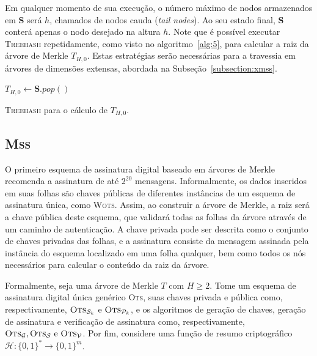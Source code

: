 \documentclass[12pt,notitlepage]{report}
\newcommand{\hh}{\mathcal{H}}
\newcommand{\pk}{\mathcal{P}_k}
\newcommand{\sk}{\mathcal{S}_k}
\newcommand{\binwds}[1]{\{0, 1\}^{#1}}
\newcommand{\fhash}[1]{\hh{} : \binwds{*} \longrightarrow \binwds{#1}}
\newcommand{\wots}{\textsc{Wots}}
\newcommand{\mss}{\textsc{Mss}}
\begin{document}
Em qualquer momento de sua execução, o número máximo de nodos armazenados em
\textbf{S} será $h$, chamados de nodos cauda (\emph{tail nodes}). Ao seu estado
final, \textbf{S} conterá apenas o nodo desejado na altura $h$.
Note que é possível executar \textsc{Treehash} repetidamente, como visto no
algoritmo~\ref{alg:5}, para calcular a raiz da árvore de Merkle $T_{H,0}$.
Estas estratégias serão necessárias para a travessia em árvores de dimensões
extensas, abordada na Subseção~\ref{subsection:xmss}.

\begin{algorithm}[ht]
\vspace{2mm}
  $T_{H, 0} \longleftarrow \mathbf{S}.pop()$\;
  \vspace{2mm}
  \caption{\textsc{Treehash} para o cálculo de $T_{H,0}$.}
  \label{alg:5}
\end{algorithm}

\subsection{\mss{}}
\label{subsection:mss}

O primeiro esquema de assinatura digital baseado em árvores de Merkle
\cite{Merkle:1989:CDS:118209.118230} recomenda a assinatura de até $2^{20}$
mensagens. Informalmente, os dados inseridos em suas folhas são chaves públicas
de diferentes instâncias de um esquema de assinatura única, como \wots{}.
Assim, ao construir a árvore de Merkle, a raiz será a chave pública deste
esquema, que validará todas as folhas da árvore através de um caminho de
autenticação. A chave privada pode ser descrita como o conjunto de chaves
privadas das folhas, e a assinatura consiste da mensagem assinada pela
instância do esquema localizado em uma folha qualquer, bem como todos os nós
necessários para calcular o conteúdo da raiz da árvore.

Formalmente, seja uma árvore de Merkle $T$ com $H \geq 2$. Tome um esquema de
assinatura digital única genérico \textsc{Ots}, suas chaves privada e pública
como, respectivamente, $\textsc{Ots}_{\sk{}}$ e $\textsc{Ots}_{\pk{}}$, e os
algoritmos de geração de chaves, geração de assinatura e verificação de
assinatura como, respectivamente, $\textsc{Ots}_\mathcal{G},
\textsc{Ots}_\mathcal{S} \text{ e } \textsc{Ots}_\mathcal{V}$. Por fim,
considere uma função de resumo criptográfico $\fhash{m}$.
\end{document}
